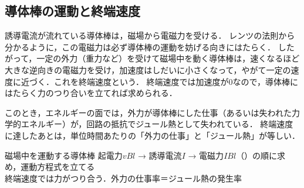\subsection{導体棒の運動と終端速度}

誘導電流が流れている導体棒は，磁場から電磁力を受ける．
レンツの法則から分かるように，{\gtfamily この電磁力は必ず導体棒の運動を妨げる向き}にはたらく．
したがって，一定の外力（重力など）を受けて磁場中を動く導体棒は，速くなるほど大きな逆向きの電磁力を受け，加速度はしだいに小さくなって，やがて一定の速度に近づく．これを{\gtfamily 終端速度}という．
終端速度では加速度が$0$なので，{\gtfamily 導体棒にはたらく力のつり合い}を立てれば求められる．

このとき，エネルギーの面では，外力が導体棒にした仕事（あるいは失われた力学的エネルギー）が，回路の抵抗でジュール熱として失われている．
終端速度に達したあとは，単位時間あたりの「外力の仕事」と「ジュール熱」が等しい．

\bsNeed{28mm}
\begin{matome}{磁場中を運動する導体棒}
 \hspace{3mm} 起電力$vBl$ → 誘導電流$I$ → 電磁力$IBl$（）の順に求め，運動方程式を立てる\\
 \hspace{3mm} 終端速度では力がつり合う．外力の仕事率＝ジュール熱の発生率
\end{matome}

